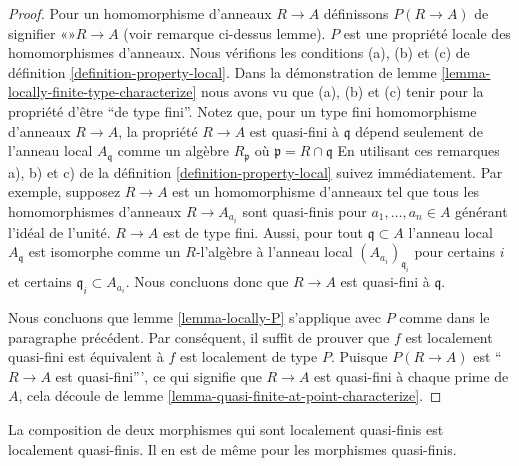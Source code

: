 \begin{proof}

Pour un homomorphisme d'anneaux $R \to A$ définissons
$P(R \to A)$ de signifier «»$R \to A$ (voir remarque ci-dessus lemme). $P$ est une propriété locale des homomorphismes d'anneaux. Nous vérifions les conditions (a), (b) et (c) de définition
\ref{definition-property-local}. Dans la démonstration de lemme \ref{lemma-locally-finite-type-characterize}
nous avons vu que (a), (b) et (c) tenir pour la propriété d'être ``de type fini''. Notez que, pour un type fini homomorphisme d'anneaux
$R \to A$, la propriété $R \to A$ est quasi-fini à $\mathfrak q$
dépend seulement de l'anneau local $A_{\mathfrak q}$ comme un algèbre $R_{\mathfrak p}$ où $\mathfrak p = R \cap \mathfrak q$
En utilisant ces remarques a), b) et c) de la définition \ref{definition-property-local} suivez immédiatement. Par exemple, supposez $R \to A$ est un homomorphisme d'anneaux tel que tous les homomorphismes d'anneaux $R \to A_{a_i}$ sont quasi-finis pour $a_1, \ldots, a_n \in A$ générant l'idéal de l'unité. $R \to A$ est de type fini. Aussi, pour tout $\mathfrak q \subset A$ l'anneau local $A_{\mathfrak q}$
est isomorphe comme un $R$-l'algèbre à l'anneau local
$(A_{a_i})_{\mathfrak q_i}$ pour certains $i$ et certains
$\mathfrak q_i \subset A_{a_i}$. Nous concluons donc que
$R \to A$ est quasi-fini à $\mathfrak q$.

\medskip\noindent
Nous concluons que lemme \ref{lemma-locally-P} s'applique avec $P$ comme dans le paragraphe précédent. Par conséquent, il suffit de prouver que $f$ est localement quasi-fini est équivalent à $f$ est localement de type $P$. Puisque $P(R \to A)$ est ``$R \to A$ est quasi-fini''', ce qui signifie que $R \to A$ est quasi-fini à chaque prime de $A$, cela découle de lemme \ref{lemma-quasi-finite-at-point-characterize}.
\end{proof}

\begin{lemma}

\label{lemma-composition-quasi-finite}

La composition de deux morphismes qui sont localement quasi-finis est localement quasi-finis. Il en est de même pour les morphismes quasi-finis.

\end{lemma}

